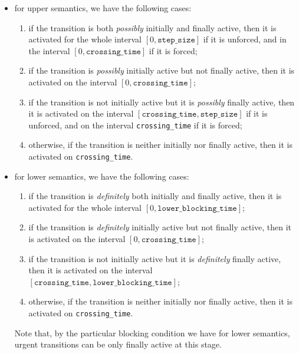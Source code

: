 \documentclass[english,a4paper]{article}
\theoremstyle{theorem}
\theoremstyle{definition}
\theoremstyle{remark}
\begin{document}
\begin{enumerate}
	\begin{itemize}
		\item for upper semantics, we have the following cases:
			\begin{enumerate}
				\item if the transition is both \emph{possibly} initially and finally active, then it is activated for the whole interval $[0, \mathtt{step\_size}]$ if it is unforced, and in the interval $[0, \mathtt{crossing\_time}]$ if it is forced;
				\item if the transition is \emph{possibly} initially active but not finally active, then it is activated on the interval $[0, \mathtt{crossing\_time}]$;

				\item if the transition is not initially active but it is \emph{possibly} finally active, then it is activated on the interval $[\mathtt{crossing\_time},\mathtt{step\_size}]$ if it is unforced, and on the interval \texttt{crossing\_time} if it is forced;

				\item otherwise, if the transition is neither initially nor finally active, then it is activated on \texttt{crossing\_time}.
	\end{enumerate}

	\item for lower semantics, we have the following cases:
			\begin{enumerate}
				\item if the transition is \emph{definitely} both initially and finally active, then it is activated for the whole interval $[0, \mathtt{lower\_blocking\_time}]$;

				\item if the transition is \emph{definitely} initially active but not finally active, then it is activated on the interval $[0, \mathtt{crossing\_time}]$;

				\item if the transition is not initially active but it is \emph{definitely} finally active, then it is activated on the interval $[\mathtt{crossing\_time},\mathtt{lower\_blocking\_time}]$;

				\item otherwise, if the transition is neither initially nor finally active, then it is activated on \texttt{crossing\_time}.
	\end{enumerate}

		\noindent Note that, by the particular blocking condition we have for lower semantics, urgent transitions can be only finally active at this stage.
\end{itemize}


\end{enumerate}
\end{document}
